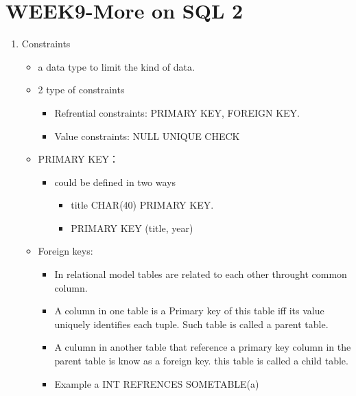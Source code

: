 \pagebreak
\section{WEEK9-More on SQL 2}


\begin{enumerate}
    \item Constraints \begin{itemize}
        \item a data type to limit the kind of data.
        \item 2 type of constraints\begin{itemize}
            \item Refrential constraints: PRIMARY KEY, FOREIGN KEY.
            \item Value constraints: NULL UNIQUE CHECK
        \end{itemize}
        \item PRIMARY KEY：\begin{itemize}
            \item could be defined in two ways \begin{itemize}
                \item title CHAR(40) PRIMARY KEY.
                \item PRIMARY KEY (title, year)
            \end{itemize}
        \end{itemize}
        \item Foreign keys: \begin{itemize}
            \item In relational model tables are  related to each other throught common column.
            \item A column in one table is a Primary key of this table iff its value uniquely identifies each tuple. Such table is called a parent table.
            \item A culumn in another table that reference a primary key column in the parent table is know as a foreign key. this table is called a child table.
            \item Example a INT REFRENCES SOMETABLE(a)
            

\end{itemize}
\end{itemize}
\end{enumerate}
